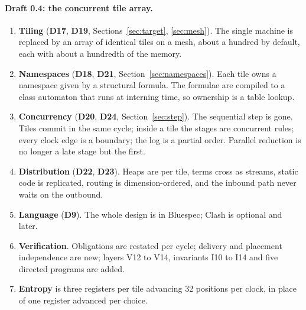 \documentclass[11pt]{article}
\newcommand{\dec}[1]{\textbf{D#1}}
\theoremstyle{definition}
\theoremstyle{remark}
\begin{document}
\paragraph{Draft 0.4: the concurrent tile array.}
\begin{enumerate}
\item \textbf{Tiling} (\dec{17}, \dec{19}, Sections~\ref{sec:target},
\ref{sec:mesh}). The single machine is replaced by an array of identical
tiles on a mesh, about a hundred by default, each with about a hundredth of
the memory.
\item \textbf{Namespaces} (\dec{18}, \dec{21},
Section~\ref{sec:namespaces}). Each tile owns a namespace given by a
structural formula. The formulae are compiled to a class automaton that runs
at interning time, so ownership is a table lookup.
\item \textbf{Concurrency} (\dec{20}, \dec{24}, Section~\ref{sec:step}). The
sequential step is gone. Tiles commit in the same cycle; inside a tile the
stages are concurrent rules; every clock edge is a boundary; the log is a
partial order. Parallel reduction is no longer a late stage but the first.
\item \textbf{Distribution} (\dec{22}, \dec{23}). Heaps are per tile, terms
cross as streams, static code is replicated, routing is dimension-ordered,
and the inbound path never waits on the outbound.
\item \textbf{Language} (\dec{9}). The whole design is in Bluespec; Clash is
optional and later.
\item \textbf{Verification}. Obligations are restated per cycle; delivery and
placement independence are new; layers V12 to V14, invariants I10 to I14 and
five directed programs are added.
\item \textbf{Entropy} is three registers per tile advancing 32 positions per
clock, in place of one register advanced per choice.
\end{enumerate}
\end{document}
